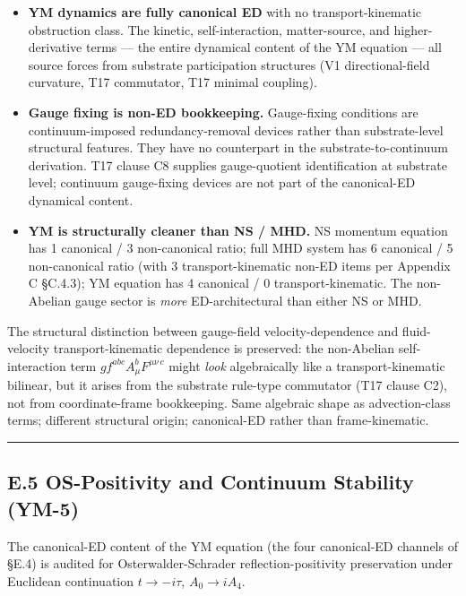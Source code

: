 \documentclass[
  11pt,a4paper]{article}
\providecommand{\tightlist}{%
  \setlength{\itemsep}{0pt}\setlength{\parskip}{0pt}}
\begin{document}
\begin{itemize}
\tightlist
\item
  \textbf{YM dynamics are fully canonical ED} with no
  transport-kinematic obstruction class. The kinetic, self-interaction,
  matter-source, and higher-derivative terms --- the entire dynamical
  content of the YM equation --- all source forces from substrate
  participation structures (V1 directional-field curvature, T17
  commutator, T17 minimal coupling).
\item
  \textbf{Gauge fixing is non-ED bookkeeping.} Gauge-fixing conditions
  are continuum-imposed redundancy-removal devices rather than
  substrate-level structural features. They have no counterpart in the
  substrate-to-continuum derivation. T17 clause C8 supplies
  gauge-quotient identification at substrate level; continuum
  gauge-fixing devices are not part of the canonical-ED dynamical
  content.
\item
  \textbf{YM is structurally cleaner than NS / MHD.} NS momentum
  equation has 1 canonical / 3 non-canonical ratio; full MHD system has
  6 canonical / 5 non-canonical ratio (with 3 transport-kinematic non-ED
  items per Appendix C §C.4.3); YM equation has 4 canonical / 0
  transport-kinematic. The non-Abelian gauge sector is \emph{more}
  ED-architectural than either NS or MHD.
\end{itemize}

The structural distinction between gauge-field velocity-dependence and
fluid-velocity transport-kinematic dependence is preserved: the
non-Abelian self-interaction term \(gf^{abc}A_\mu^b F^{\mu\nu\,c}\)
might \emph{look} algebraically like a transport-kinematic bilinear, but
it arises from the substrate rule-type commutator (T17 clause C2), not
from coordinate-frame bookkeeping. Same algebraic shape as
advection-class terms; different structural origin; canonical-ED rather
than frame-kinematic.

\begin{center}\rule{0.5\linewidth}{0.5pt}\end{center}

\subsection{E.5 OS-Positivity and Continuum Stability
(YM-5)}\label{e.5-os-positivity-and-continuum-stability-ym-5}

The canonical-ED content of the YM equation (the four canonical-ED
channels of §E.4) is audited for Osterwalder-Schrader
reflection-positivity preservation under Euclidean continuation
\(t \to -i\tau\), \(A_0 \to iA_4\).
\end{document}
